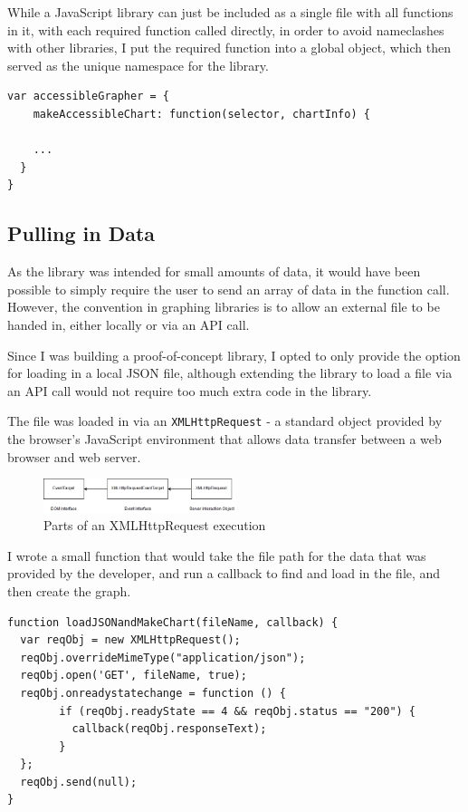 \documentclass[ %
                    author={Aleena Baig},
                supervisor={Dr Simon Lock},
                    degree={BSc},
                     title={On Making Web Accessible Graphs},
                  subtitle={},
                      year={2019} ]{dissertation}
\begin{document}
While a JavaScript library can just be included as a single file with all functions in it, with each required function called directly, in order to avoid nameclashes with other libraries, I put the required function into a global object, which then served as the unique namespace for the library.
\newline
\begin{lstlisting}
var accessibleGrapher = {
    makeAccessibleChart: function(selector, chartInfo) {

    ...
  }
}
\end{lstlisting}

\subsection{Pulling in Data}

As the library was intended for small amounts of data, it would have been possible to simply require the user to send an array of data in the function call. However, the convention in graphing libraries is to allow an external file to be handed in, either locally or via an API call.

Since I was building a proof-of-concept library, I opted to only provide the option for loading in a local JSON file, although extending the library to load a file via an API call would not require too much extra code in the library.

The file was loaded in via an \texttt{XMLHttpRequest} - a standard object provided by the browser's JavaScript environment that allows data transfer between a web browser and web server.

\begin{figure}[h]
\centering
\includegraphics[width=0.5\textwidth]{images/XMLHttpRequest.png}
\caption{Parts of an XMLHttpRequest execution}
\end{figure}

I wrote a small function that would take the file path for the data that was provided by the developer, and run a callback to find and load in the file, and then create the graph.

\begin{lstlisting}
function loadJSONandMakeChart(fileName, callback) {
  var reqObj = new XMLHttpRequest();
  reqObj.overrideMimeType("application/json");
  reqObj.open('GET', fileName, true);
  reqObj.onreadystatechange = function () {
        if (reqObj.readyState == 4 && reqObj.status == "200") {
          callback(reqObj.responseText);
        }
  };
  reqObj.send(null);
}
\end{lstlisting}
\end{document}
